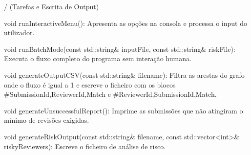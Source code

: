   /  (Tarefas  e Escrita de Output) \begin{DoxyVerb}void runInteractiveMenu(): Apresenta as opções na consola e processa o input do utilizador.

void runBatchMode(const std::string& inputFile, const std::string& riskFile): Executa o fluxo completo do programa sem interação humana.

void generateOutputCSV(const std::string& filename): Filtra as arestas do grafo onde o fluxo é igual a 1 e escreve o ficheiro com os blocos #SubmissionId,ReviewerId,Match e #ReviewerId,SubmissionId,Match.

void generateUnsuccessfulReport(): Imprime as submissões que não atingiram o mínimo de revisões exigidas.

void generateRiskOutput(const std::string& filename, const std::vector<int>& riskyReviewers): Escreve o ficheiro de análise de risco.
\end{DoxyVerb}
 